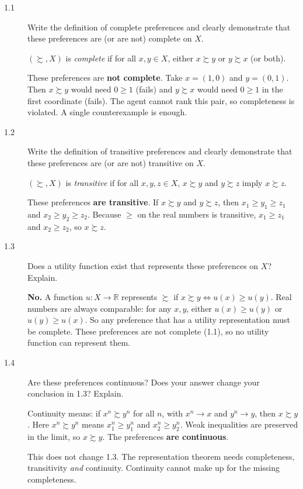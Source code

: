 \begin{description}
\item[1.1] Write the definition of complete preferences and clearly demonstrate that these preferences are (or are not) complete on $X$.
\begin{solution}
$(\succsim,X)$ is \emph{complete} if for all $x,y\in X$, either $x\succsim y$ or $y\succsim x$ (or both).

These preferences are \textbf{not complete}. Take $x=(1,0)$ and $y=(0,1)$. Then $x\succsim y$ would need $0\ge 1$ (fails) and $y\succsim x$ would need $0\ge 1$ in the first coordinate (fails). The agent cannot rank this pair, so completeness is violated. A single counterexample is enough.
\end{solution}
\item[1.2] Write the definition of transitive preferences and clearly demonstrate that these preferences are (or are not) transitive on $X$.
\begin{solution}
$(\succsim,X)$ is \emph{transitive} if for all $x,y,z\in X$, $x\succsim y$ and $y\succsim z$ imply $x\succsim z$.

These preferences \textbf{are transitive}. If $x\succsim y$ and $y\succsim z$, then $x_1\ge y_1\ge z_1$ and $x_2\ge y_2\ge z_2$. Because $\ge$ on the real numbers is transitive, $x_1\ge z_1$ and $x_2\ge z_2$, so $x\succsim z$.
\end{solution}
\item[1.3] Does a utility function exist that represents these preferences on $X$? Explain.
\begin{solution}
\textbf{No.} A function $u:X\to\mathbb{R}$ represents $\succsim$ if $x\succsim y \iff u(x)\ge u(y)$. Real numbers are always comparable: for any $x,y$, either $u(x)\ge u(y)$ or $u(y)\ge u(x)$. So any preference that has a utility representation must be complete. These preferences are not complete (1.1), so no utility function can represent them.
\end{solution}
\item[1.4] Are these preferences continuous? Does your answer change your conclusion in 1.3? Explain.
\begin{solution}
Continuity means: if $x^n\succsim y^n$ for all $n$, with $x^n\to x$ and $y^n\to y$, then $x\succsim y$. Here $x^n\succsim y^n$ means $x^n_1\ge y^n_1$ and $x^n_2\ge y^n_2$. Weak inequalities are preserved in the limit, so $x\succsim y$. The preferences \textbf{are continuous}.

This does not change 1.3. The representation theorem needs completeness, transitivity \emph{and} continuity. Continuity cannot make up for the missing completeness.
\end{solution}
\end{description}

